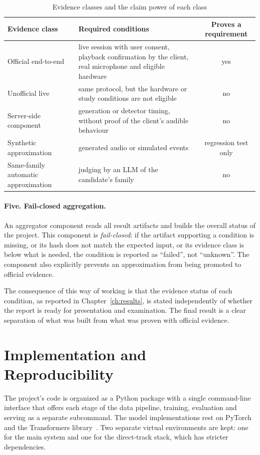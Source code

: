 \begin{table}[ht]
\centering
\caption{Evidence classes and the claim power of each class}
\label{tab:evidence-classes}
\small
\begin{tabular}{L{3.6cm}L{5.8cm}c}
\toprule
\textbf{Evidence class} & \textbf{Required conditions} & \textbf{Proves a requirement} \\
\midrule
Official end-to-end & live session with user consent, playback confirmation by the
client, real microphone and eligible hardware & yes \\
Unofficial live & same protocol, but the hardware or study conditions are not eligible
& no \\
Server-side component & generation or detector timing, without proof of the client's
audible behaviour & no \\
Synthetic approximation & generated audio or simulated events & regression test only \\
Same-family automatic approximation & judging by an LLM of the candidate's family & no \\
\bottomrule
\end{tabular}
\end{table}

\paragraph{Five. Fail-closed aggregation.} An aggregator component reads all result
artifacts and builds the overall status of the project. This component is
\emph{fail-closed}: if the artifact supporting a condition is missing, or its hash does not
match the expected input, or its evidence class is below what is needed, the condition is
reported as ``failed'', not ``unknown''. The component also explicitly prevents an
approximation from being promoted to official evidence.

The consequence of this way of working is that the evidence status of each condition, as
reported in Chapter~\ref{ch:results}, is stated independently of whether the report is ready
for presentation and examination. The final result is a clear separation of what was built
from what was proven with official evidence.

\section{Implementation and Reproducibility}
\label{sec:impl}

The project's code is organized as a Python package with a single command-line interface
that offers each stage of the data pipeline, training, evaluation and serving as a separate
subcommand. The model implementations rest on PyTorch~\cite{paszke2019pytorch} and the
Transformers library~\cite{wolf2020transformers}. Two separate virtual environments are
kept: one for the main system and one for the direct-track stack, which has stricter
dependencies.


